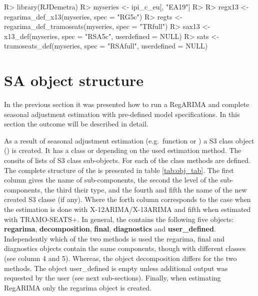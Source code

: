 \documentclass[article]{jss}
\begin{document}
\begin{CodeChunk}

\begin{CodeInput}
R> library(RJDemetra)
R> myseries <- ipi_c_eu[, "EA19"]
R> 
R> regx13 <- regarima_def_x13(myseries, spec = "RG5c")
R> regts <- regarima_def_tramoseats(myseries, spec = "TRfull")
R> sax13 <- x13_def(myseries, spec = "RSA5c", userdefined = NULL)
R> sats <- tramoseats_def(myseries, spec = "RSAfull", userdefined = NULL)
\end{CodeInput}
\end{CodeChunk}

\hypertarget{sa-object-structure}{%
\section{SA object structure}\label{sa-object-structure}}

In the previous section it was presented how to run a RegARIMA and
complete seasonal adjustment estimation with pre-defined model
specifications. In this section the outcome will be described in detail.

As a result of seasonal adjustment estimation (e.g.~function
 or ) a S3 class object
() is created. It has a class  or
 depending on the used estimation method.
The  consits of lists of S3 class sub-objects. For each
of the class  methods are defined. The complete
structure of the  is presented in table
\ref{tab:obj_tab}. The first column gives the name of 
sub-components, the second the level of the sub-components, the third
their type, and the fourth and fifth the name of the new created S3
classe (if any). Where the forth column corresponds to the case when the
estimation is done with X-12ARIMA/X-13ARIMA and fifth when estimated
with TRAMO-SEATS+. In general, the  contains the
following five objects: \textbf{regarima}, \textbf{decomposition},
\textbf{final}, \textbf{diagnostics} and \textbf{user\_defined}.
Independently which of the two methods is used the regarima, final and
diagnostics objects contain the same components, though with different
classes (see column 4 and 5). Whereas, the object decomposition differs
for the two methods. The object user\_defined is empty unless additional
output was requested by the user (see next sub-sections). Finally, when
estimating RegARIMA only the regarima object is created.
\end{document}
